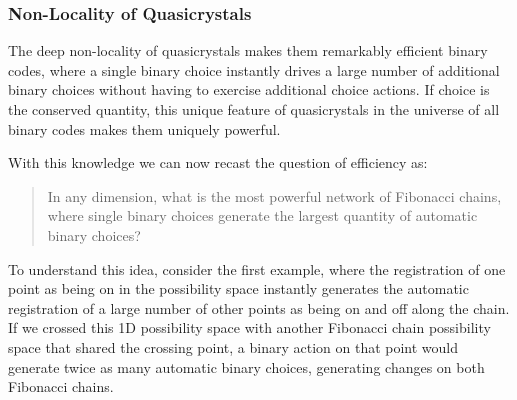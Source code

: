 \documentclass[submission,copyright,creativecommons]{eptcs}
\begin{document}
\subsubsection{Non-Locality of Quasicrystals}

The deep non-locality of quasicrystals makes them remarkably efficient binary codes, where a single binary choice instantly drives a large number of additional binary choices without having to exercise additional choice actions. If choice is the conserved quantity, this unique feature of quasicrystals in the universe of all binary codes makes them uniquely powerful.

With this knowledge we can now recast the question of efficiency as:

\begin{quote}
In any dimension, what is the most powerful network of Fibonacci chains, where single binary choices generate the largest quantity of automatic binary choices?
\source{}
\end{quote}

To understand this idea, consider the first example, where the registration of one point as being on in the possibility space instantly generates the automatic registration of a large number of other points as being on and off along the chain. If we crossed this 1D possibility space with another Fibonacci chain possibility space that shared the crossing point, a binary action on that point would generate twice as many automatic binary choices, generating changes on both Fibonacci chains.
\end{document}
